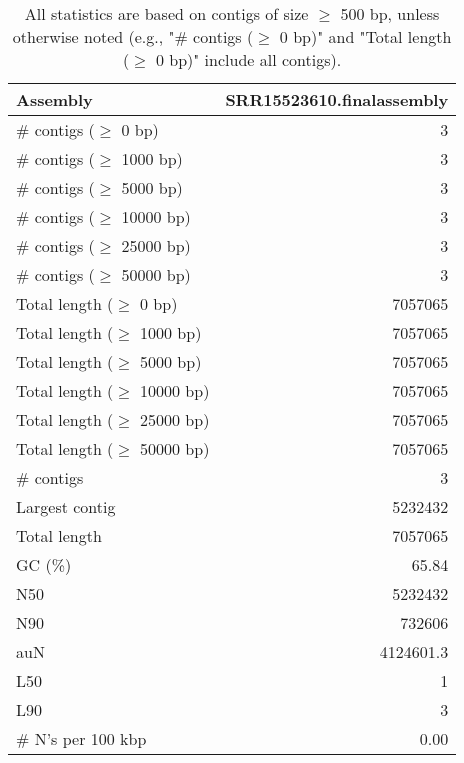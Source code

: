 \documentclass[12pt,a4paper]{article}
\begin{document}
\begin{table}[ht]
\begin{center}
\caption{All statistics are based on contigs of size $\geq$ 500 bp, unless otherwise noted (e.g., "\# contigs ($\geq$ 0 bp)" and "Total length ($\geq$ 0 bp)" include all contigs).}
\begin{tabular}{|l*{1}{|r}|}
\hline
Assembly & SRR15523610.finalassembly \\ \hline
\# contigs ($\geq$ 0 bp) & 3 \\ \hline
\# contigs ($\geq$ 1000 bp) & 3 \\ \hline
\# contigs ($\geq$ 5000 bp) & 3 \\ \hline
\# contigs ($\geq$ 10000 bp) & 3 \\ \hline
\# contigs ($\geq$ 25000 bp) & 3 \\ \hline
\# contigs ($\geq$ 50000 bp) & 3 \\ \hline
Total length ($\geq$ 0 bp) & 7057065 \\ \hline
Total length ($\geq$ 1000 bp) & 7057065 \\ \hline
Total length ($\geq$ 5000 bp) & 7057065 \\ \hline
Total length ($\geq$ 10000 bp) & 7057065 \\ \hline
Total length ($\geq$ 25000 bp) & 7057065 \\ \hline
Total length ($\geq$ 50000 bp) & 7057065 \\ \hline
\# contigs & 3 \\ \hline
Largest contig & 5232432 \\ \hline
Total length & 7057065 \\ \hline
GC (\%) & 65.84 \\ \hline
N50 & 5232432 \\ \hline
N90 & 732606 \\ \hline
auN & 4124601.3 \\ \hline
L50 & 1 \\ \hline
L90 & 3 \\ \hline
\# N's per 100 kbp & 0.00 \\ \hline
\end{tabular}
\end{center}
\end{table}
\end{document}
